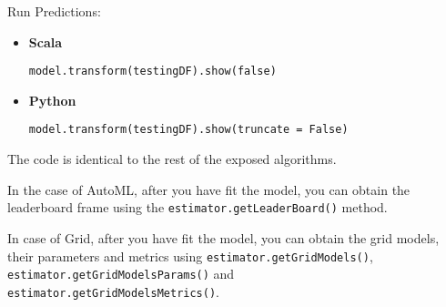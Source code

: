 \documentclass{standalone}
\begin{document}
	Run Predictions:

	\begin{itemize}
		\item \textbf{Scala} \begin{lstlisting}[style=Scala]
model.transform(testingDF).show(false)
		\end{lstlisting}
		\item \textbf{Python} \begin{lstlisting}[style=Python]
model.transform(testingDF).show(truncate = False)
		\end{lstlisting}
	\end{itemize}

	The code is identical to the rest of the exposed algorithms.

	In the case of AutoML, after you have fit the model, you can obtain the leaderboard frame using the
	\texttt{estimator.getLeaderBoard()} method.

	In case of Grid, after you have fit the model, you can obtain the grid models, their parameters and metrics using
	\texttt{estimator.getGridModels()}, \texttt{estimator.getGridModelsParams()} and \\
	\texttt{estimator.getGridModelsMetrics()}.
\end{document}
